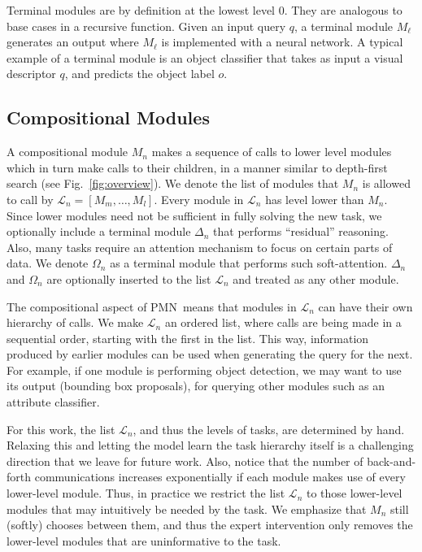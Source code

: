 \documentclass{article}
\makeatletter
\newcommand{\SK}[1]{{\color{NavyBlue}{[@Seung: #1]}}}
\def\PMN{PMN}
\makeatother
\begin{document}
Terminal modules %
are by definition at the lowest level $0$.
They are analogous to base cases in a recursive function.
Given an input query $q$, a terminal module $M_\ell$ generates an output
where $M_\ell$ is implemented with a neural network.
A typical example of a terminal module is an object classifier that takes as input a visual descriptor $q$, and predicts the object label $o$.

\vspace{-2mm}\subsection{Compositional Modules}\label{sec:compositional_modules}\vspace{-1mm}

A compositional module $M_n$ makes a sequence of calls to lower level modules which in turn make calls to their children, in a manner similar to depth-first search (see Fig.~\ref{fig:overview}).
We denote the list of modules that $M_n$ is allowed to call by $\mathcal{L}_n=[M_m,\ldots,M_l]$.
Every module in $\mathcal L_n$ has level lower than $M_n$.
Since lower modules need not be sufficient in fully solving the new task, we optionally include a terminal module $\Delta_n$ that performs ``residual'' reasoning.
Also, many tasks require an attention mechanism to focus on certain parts of data.
We denote $\Omega_n$ as a terminal module that performs such soft-attention.
$\Delta_n$ and $\Omega_n$ are optionally inserted to the list $\mathcal L_n$ and treated as any other module.

The compositional aspect of \PMN~means that modules in $\mathcal L_n$ can have their own hierarchy of calls.
We make $\mathcal L_n$ an ordered list, where calls are being made in a sequential order, starting with the first in the list.
This way, information produced by earlier modules can be used when generating the query for the next.
For example, if one module is performing object detection, we may want to use its output (bounding box proposals), for querying other modules such as an attribute classifier.

For this work, the list $\mathcal L_n$, and thus the levels of tasks, are determined by hand.
Relaxing this and letting the model learn the task hierarchy itself is a challenging direction that we leave for future work.
Also, notice that the number of back-and-forth communications increases exponentially if each module makes use of every lower-level module.
Thus, in practice we restrict the list $\mathcal L_n$ to those lower-level modules that may intuitively  be needed by the task.
We emphasize that $M_n$ still (softly) chooses between them, and thus the expert intervention only removes the lower-level modules that are uninformative to the task.
\end{document}
